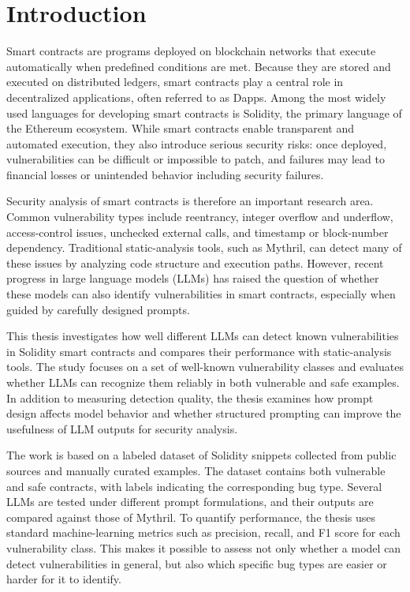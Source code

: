 \documentclass[a4paper,11pt]{article}\usepackage{graphicx} %
\begin{document}
\section{Introduction}

Smart contracts are programs deployed on blockchain networks that execute automatically when predefined conditions are met. Because they are stored and executed on distributed ledgers, smart contracts play a central role in decentralized applications, often referred to as Dapps. Among the most widely used languages for developing smart contracts is Solidity, the primary language of the Ethereum ecosystem. While smart contracts enable transparent and automated execution, they also introduce serious security risks: once deployed, vulnerabilities can be difficult or impossible to patch, and failures may lead to financial losses or unintended behavior including security failures.

Security analysis of smart contracts is therefore an important research area. Common vulnerability types include reentrancy, integer overflow and underflow, access-control issues, unchecked external calls, and timestamp or block-number dependency. Traditional static-analysis tools, such as Mythril, can detect many of these issues by analyzing code structure and execution paths. However, recent progress in large language models (LLMs) has raised the question of whether these models can also identify vulnerabilities in smart contracts, especially when guided by carefully designed prompts.

This thesis investigates how well different LLMs can detect known vulnerabilities in Solidity smart contracts and compares their performance with static-analysis tools. The study focuses on a set of well-known vulnerability classes and evaluates whether LLMs can recognize them reliably in both vulnerable and safe examples. In addition to measuring detection quality, the thesis examines how prompt design affects model behavior and whether structured prompting can improve the usefulness of LLM outputs for security analysis.

The work is based on a labeled dataset of Solidity snippets collected from public sources and manually curated examples. The dataset contains both vulnerable and safe contracts, with labels indicating the corresponding bug type. Several LLMs are tested under different prompt formulations, and their outputs are compared against those of Mythril. To quantify performance, the thesis uses standard machine-learning metrics such as precision, recall, and F1 score for each vulnerability class. This makes it possible to assess not only whether a model can detect vulnerabilities in general, but also which specific bug types are easier or harder for it to identify.
\end{document}
